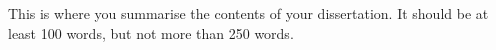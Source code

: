 This is where you summarise the contents of your dissertation. It should be
at least 100 words, but not more than 250 words.

